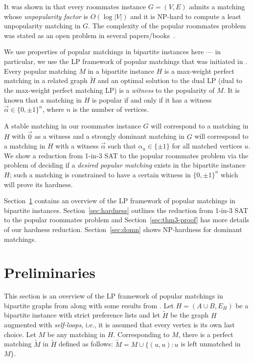 \documentclass{llncs}
\begin{document}
It was shown in \cite{HK13} that every roommates instance $G = (V,E)$ admits a matching whose {\em unpopularity factor} is $O(\log|V|)$ and it is NP-hard to
compute a least unpopularity matching in $G$. The complexity of the popular roommates problem was stated as an open problem in several papers/books~\cite{BIM10,Cseh17,HK13,HK17,Man2013}.

\medskip

We use properties of popular matchings in bipartite instances here
--- in particular, we use the LP framework of popular matchings that was initiated in \cite{KMN09}. Every popular matching $M$ in a bipartite instance $H$
is a max-weight perfect matching in a related graph $\tilde{H}$ and an optimal solution to the dual LP (dual to the max-weight perfect matching LP) is
a {\em witness} to the popularity of $M$. It is known that
a matching in $H$ is popular if and only if it has a witness $\vec{\alpha} \in \{0,\pm 1\}^n$, where $n$ is the number of vertices.

A stable matching in our roommates instance $G$ will correspond to a matching in $H$ with  $\vec{0}$ as a witness
and a strongly dominant matching in $G$ will correspond to a matching in $H$ with a witness
$\vec{\alpha}$ such that $\alpha_u \in \{\pm 1\}$ for all matched vertices $u$. We show a reduction from 1-in-3 SAT to the popular roommates
problem via the problem of deciding if a {\em desired popular matching} exists in the bipartite instance $H$;
such a matching is constrained to have a certain witness in $\{0, \pm 1\}^n$ which will prove its hardness.



\medskip

 Section~\ref{prelims} contains an overview of the LP framework of popular matchings in bipartite instances.
Section~\ref{sec:hardness} outlines the reduction from 1-in-3 SAT to the popular roommates problem and Section~\ref{sec:thm3-proof} has more details of
our hardness reduction. Section~\ref{sec:domn} shows NP-hardness for dominant matchings.


\section{Preliminaries}
\label{prelims}
This section is an overview of the LP framework of popular matchings in bipartite graphs from \cite{KMN09} along with some results
from \cite{Kav16,Kav18}.
Let $H = (A \cup B, E_H)$ be a bipartite instance with strict preference lists and 
let $\tilde{H}$ be the graph $H$ augmented with {\em self-loops}, i.e., it is assumed that every vertex is its own last choice.
Let $M$ be any matching in $H$. Corresponding to $M$,
there is a perfect matching $\tilde{M}$ in $\tilde{H}$ defined as follows: $\tilde{M} = M \cup \{(u,u): u$ is left unmatched in $M\}$. 
\end{document}
